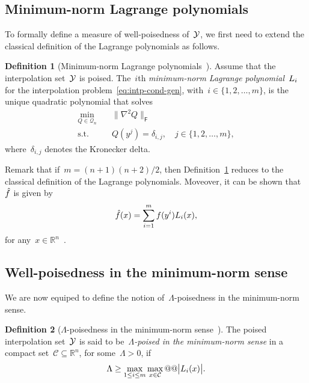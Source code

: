 \documentclass[draft]{article}
\numberwithin{equation}{section}
\theoremstyle{definition}
\newtheorem{definition}{Definition}[section]
\theoremstyle{plain}
\theoremstyle{remark}
\newcommand*{\abs}[2][]{#1\lvert#2#1\rvert}
\newcommand*{\lagp}[1][]{L\ifblank{#1}{}{_{#1}}}
\newcommand*{\norm}[2][]{#1\lVert#2#1\rVert}
\newcommand*{\obj}{f}
\newcommand*{\objm}[1][]{\hat{\obj}\ifblank{#1}{}{^{#1}}}
\newcommand*{\qpoly}{\mathcal{Q}_n}
\newcommand*{\R}{\mathbb{R}}
\newcommand*{\set}[2][]{#1\{#2#1\}}
\newcommand*{\xpt}[1][]{\mathcal{Y}\ifblank{#1}{}{^{#1}}}
\begin{document}
\subsection{Minimum-norm Lagrange polynomials}

To formally define a measure of well-poisedness of~$\xpt$, we first need to extend the classical definition of the Lagrange polynomials as follows.

\begin{definition}[Minimum-norm Lagrange polynomials~{\cite[Definition~5.1]{Conn_Scheinberg_Vicente_2009}}]
    \label{def:min-norm-lagp}
    Assume that the interpolation set~$\xpt$ is poised.
    The~$i$th \emph{minimum-norm Lagrange polynomial}~$\lagp[i]$ for the interpolation problem~\eqref{eq:intp-cond-gen}, with~$i \in \set{1, 2, \dots, m}$, is the unique quadratic polynomial that solves
    \begin{equation*}
        \begin{aligned}
            \min_{Q \in \qpoly} & \quad \norm[\big]{\nabla^2 Q}_{\mathsf{F}}\\
            \text{s.t.}         & \quad Q(y^j) = \delta_{i, j}, \quad j \in \set{1, 2, \dots, m},
        \end{aligned}
    \end{equation*}
    where~$\delta_{i, j}$ denotes the Kronecker delta.
\end{definition}

Remark that if~$m = (n + 1) (n + 2) / 2$, then Definition~\ref{def:min-norm-lagp} reduces to the classical definition of the Lagrange polynomials.
Moveover, it can be shown that~$\objm$ is given by
\begin{equation*}
    \objm(x) = \sum_{i = 1}^m \obj(y^i) \lagp[i](x),
\end{equation*}
for any~$x \in \R^n$~\cite[Lemma~5.2]{Conn_Scheinberg_Vicente_2009}.

\subsection{Well-poisedness in the minimum-norm sense}

We are now equiped to define the notion of~$\Lambda$-poisedness in the minimum-norm sense.

\begin{definition}[$\Lambda$-poisedness in the minimum-norm sense~{\cite[Definition~5.6]{Conn_Scheinberg_Vicente_2009}}]
    \label{def:lambda-p}
    The poised interpolation set~$\xpt$ is said to be~\emph{$\Lambda$-poised in the minimum-norm sense} in a compact set~$\mathcal{C} \subseteq \R^n$, for some~$\Lambda > 0$, if
    \begin{equation*}
        \Lambda \ge \max_{1 \le i \le m} \max_{x \in \mathcal{C}} @@ \abs[\big]{\lagp[i](x)}.
    \end{equation*}
\end{definition}
\end{document}
